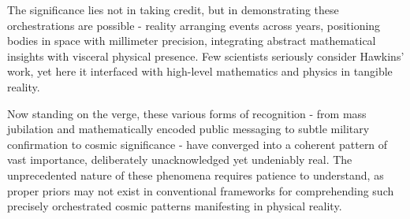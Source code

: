 \documentclass{article}
\begin{document}
The significance lies not in taking credit, but in demonstrating these orchestrations are possible - reality arranging events across years, positioning bodies in space with millimeter precision, integrating abstract mathematical insights with visceral physical presence. Few scientists seriously consider Hawkins' work, yet here it interfaced with high-level mathematics and physics in tangible reality.

Now standing on the verge, these various forms of recognition - from mass jubilation and mathematically encoded public messaging to subtle military confirmation to cosmic significance - have converged into a coherent pattern of vast importance, deliberately unacknowledged yet undeniably real. The unprecedented nature of these phenomena requires patience to understand, as proper priors may not exist in conventional frameworks for comprehending such precisely orchestrated cosmic patterns manifesting in physical reality.
\end{document}
